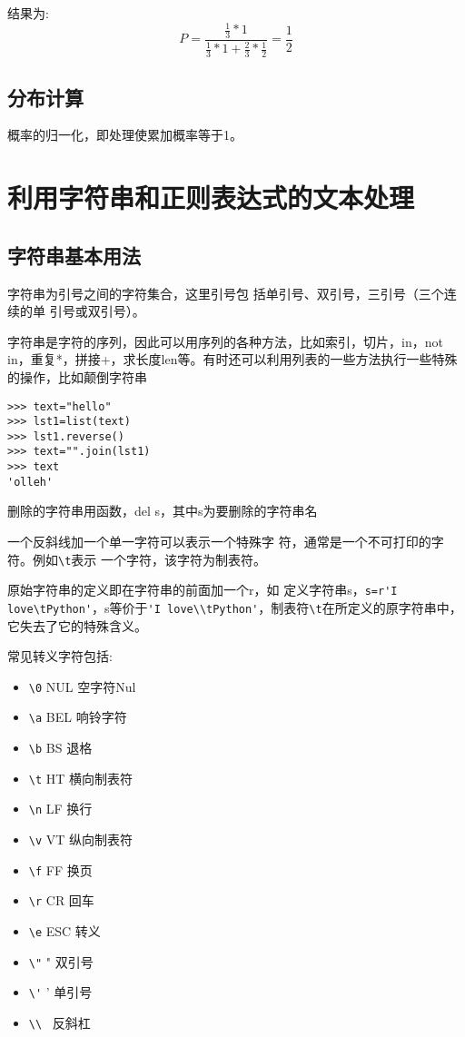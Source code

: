 \documentclass[twoside,11pt]{book}
\begin{document}
结果为:
\begin{equation}\label{eq:bayes:mmdoua}
P=\frac{\frac{1}{3}*1}{\frac{1}{3}*1 +\frac{2}{3}*\frac{1}{2}}=\frac{1}{2}
\end{equation}


\section{分布计算}

概率的归一化，即处理使累加概率等于1。


\chapter{利用字符串和正则表达式的文本处理}


\section{字符串基本用法}


字符串为引号之间的字符集合，这里引号包
括单引号、双引号，三引号（三个连续的单
引号或双引号）。

字符串是字符的序列，因此可以用序列的各种方法，比如索引，切片，in，not in，重复*，拼接+，求长度len等。有时还可以利用列表的一些方法执行一些特殊的操作，比如颠倒字符串
\begin{lstlisting}
>>> text="hello"
>>> lst1=list(text)
>>> lst1.reverse()
>>> text="".join(lst1)
>>> text
'olleh'
\end{lstlisting}


删除的字符串用函数，del s，其中s为要删除的字符串名

一个反斜线加一个单一字符可以表示一个特殊字
符，通常是一个不可打印的字符。例如\verb|\t|表示
一个字符，该字符为制表符。

原始字符串的定义即在字符串的前面加一个r，如
定义字符串s，\verb|s=r'I love\tPython'|，s等价于\verb|'I love\\tPython'|，制表符\verb|\t|在所定义的原字符串中，它失去了它的特殊含义。

常见转义字符包括:
\begin{itemize}
  \item \verb|\0| NUL 空字符Nul
  \item \verb|\a| BEL 响铃字符
  \item \verb|\b| BS 退格
  \item \verb|\t| HT 横向制表符
  \item \verb|\n| LF 换行
  \item \verb|\v| VT 纵向制表符
  \item \verb|\f| FF 换页
  \item \verb|\r| CR 回车
  \item \verb|\e| ESC 转义
  \item \verb|\"| " 双引号
  \item \verb|\'| ' 单引号
  \item \verb|\\| \ 反斜杠
\end{itemize}
\end{document}
